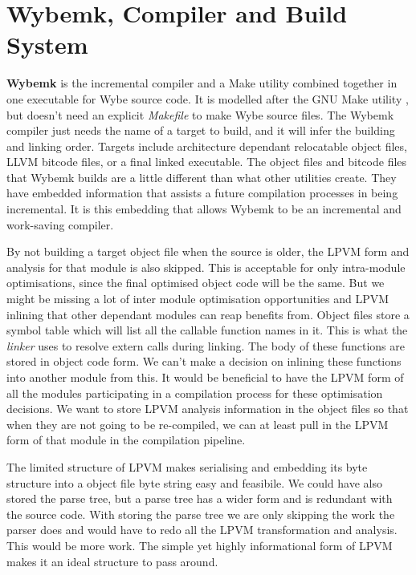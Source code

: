 \chapter{Wybemk, Compiler and Build System}
\label{chap:build_system}

\textbf{Wybemk} is the incremental compiler and a Make utility combined
together in one executable for Wybe source code. It is modelled after the GNU
Make utility \citep{make}, but doesn't need an explicit \textit{Makefile} to
make Wybe source files. The Wybemk compiler just needs the name of a target to
build, and it will infer the building and linking order. Targets include
architecture dependant relocatable object files, LLVM bitcode files, or a final
linked executable. The object files and bitcode files that Wybemk builds are a
little different than what other utilities create. They have embedded
information that assists a future compilation processes in being
incremental. It is this embedding that allows Wybemk to be an incremental and
work-saving compiler.

By not building a target object file when the source is older, the LPVM form
and analysis for that module is also skipped. This is acceptable for only
intra-module optimisations, since the final optimised object code will be the
same. But we might be missing a lot of inter module optimisation opportunities
and LPVM inlining that other dependant modules can reap benefits from. Object
files store a symbol table which will list all the callable function names in
it. This is what the \textit{linker} uses to resolve extern calls during
linking. The body of these functions are stored in object code form. We can't
make a decision on inlining these functions into another module from this. It
would be beneficial to have the LPVM form of all the modules participating in a
compilation process for these optimisation decisions. We want to store LPVM
analysis information in the object files so that when they are not going to be
re-compiled, we can at least pull in the LPVM form of that module in the
compilation pipeline.

The limited structure of LPVM makes serialising and embedding its byte
structure into a object file byte string easy and feasibile. We could have also
stored the parse tree, but a parse tree has a wider form and is redundant with
the source code. With storing the parse tree we are only skipping the work the
parser does and would have to redo all the LPVM transformation and
analysis. This would be more work. The simple yet highly informational form of
LPVM makes it an ideal structure to pass around.


